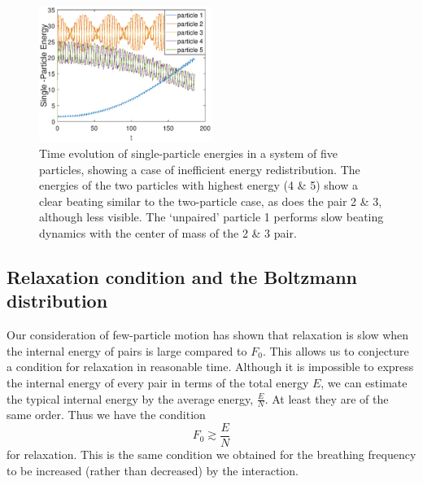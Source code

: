 \documentclass[onecolumn,pra]{revtex4-1}
\begin{document}
\begin{figure}
\centering
\includegraphics[width=0.5\textwidth]{ZhiyuPictures/pair1_pre.eps}
\caption{Time evolution of single-particle energies in a system of five particles, showing a case of
  inefficient energy redistribution.  The energies of the two particles with highest energy (4 \& 5)
  show a clear beating similar to the two-particle case, as does the pair 2 \& 3, although less
  visible.  The `unpaired' particle 1 performs slow beating dynamics with the center of mass of the
  2 \& 3 pair.}
\label{fig:thermalization4}
\end{figure}




\subsection{Relaxation condition and the Boltzmann distribution}

Our consideration of few-particle motion has shown that relaxation is slow when the internal energy
of pairs is large compared to $F_0$.  This allows us to conjecture a condition for relaxation in
reasonable time.  Although it is impossible to express the internal energy of every pair in terms of
the total energy $E$, we can estimate the typical internal energy by the average energy,
$\frac{E}{N}$. At least they are of the same order.  Thus we have the condition
\begin{equation}
F_0 \gtrsim \frac{E}{N}
\label{eq:thermalizatiton_condition}
\end{equation}
for relaxation.  This is the same condition we obtained for the breathing frequency to be increased
(rather than decreased) by the interaction. 
\end{document}
